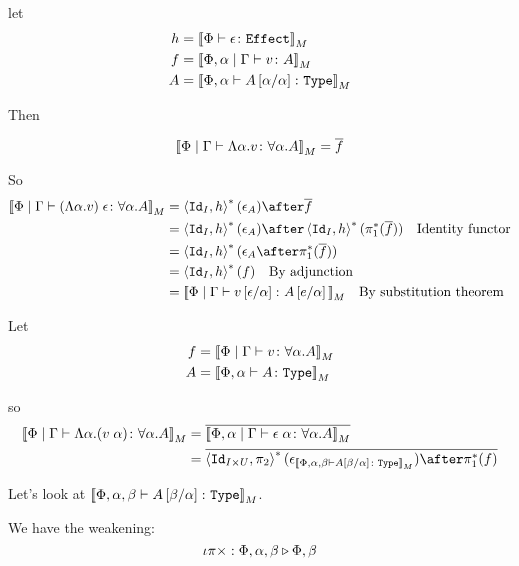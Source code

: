 \documentclass{report}
\begin{document}
    let 
    \begin{align}
        h & = {\bf [\![}\Phi \vdash \epsilon \colon \texttt{Effect}{\bf ]\!]}_M
        \\
        f & = {\bf [\![}\Phi,\alpha\mid\Gamma \vdash v \colon A{\bf ]\!]}_M
        \\
        A &= {\bf [\![}\Phi,\alpha \vdash A\left[\alpha / \alpha\right] \colon \texttt{Type}{\bf ]\!]}_M
    \end{align}

    Then

    \begin{equation}
        {\bf [\![}\Phi\mid\Gamma \vdash \Lambda \alpha. v \colon \forall \alpha. A{\bf ]\!]}_M = \overline{f}\\
    \end{equation}

    So
    \begin{align}
        \deno{\gpetyperelation{\eapp{(\elam{\a}{v})}{\e}}{\all{\a}{A}}} & = \pr{\Id{I}}{h}\star(\e_A)\after\bar{f}\\
        & = \pr{\Id{I}}{h}\star(\e_A)\after\pr{\Id{I}}{h}\star(\pstar(\bar{f}))\qt{Identity functor}\\
        &= \pr{\Id{I}}{h}\star(\e_A\after\pstar(\bar{f}))\\
        &= \pr{\Id{I}}{h}\star(f)\qt{By adjunction}\\
        &= \deno{\gpetyperelation{v\ssub{\a}{\e}}{A\ssub{\a}{e}}}\qt{By substitution theorem}\\
    \end{align}

    Let \begin{align}
        f & = {\bf [\![}\Phi\mid\Gamma \vdash v \colon \forall \alpha. A{\bf ]\!]}_M\\
        A & = {\bf [\![}\Phi,\alpha \vdash A \colon \texttt{Type}{\bf ]\!]}_M
    \end{align}

    so
    \begin{align}
        \deno{\gpetyperelation{\elam{\a}{(\eapp{v}{\a})}}{\all{\a}{A}}} & = \bar{\deno{\etyperelation{\P,\a}{\G}{\eapp{\e}{\a}}{\all{\a}{A}}}} \\
        & = \bar{\pr{\Id{I\times U}}{\pp}\star(\e_{\deno{\typerelation{\P,\a,\b}{A\ssub{\a}{\b}}{\type}}})\after\pstar(f)}
    \end{align}

    Let's look at ${\bf [\![}\Phi,\alpha,\beta \vdash A\left[\beta / \alpha\right] \colon \texttt{Type}{\bf ]\!]}_M$.

    We have the weakening:
    \begin{equation}
        \iota\pi\times : \Phi,\alpha,\beta \triangleright \Phi,\beta
    \end{equation}
\end{document}
